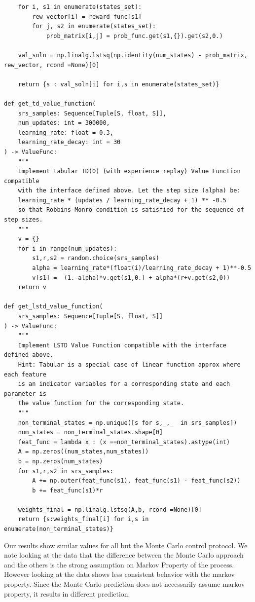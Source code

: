 \documentclass{article}[12pt]
\begin{document}
\begin{lstlisting}
    for i, s1 in enumerate(states_set):
        rew_vector[i] = reward_func[s1]
        for j, s2 in enumerate(states_set):
            prob_matrix[i,j] = prob_func.get(s1,{}).get(s2,0.)

    val_soln = np.linalg.lstsq(np.identity(num_states) - prob_matrix, rew_vector, rcond =None)[0]

    return {s : val_soln[i] for i,s in enumerate(states_set)}

def get_td_value_function(
    srs_samples: Sequence[Tuple[S, float, S]],
    num_updates: int = 300000,
    learning_rate: float = 0.3,
    learning_rate_decay: int = 30
) -> ValueFunc:
    """
    Implement tabular TD(0) (with experience replay) Value Function compatible
    with the interface defined above. Let the step size (alpha) be:
    learning_rate * (updates / learning_rate_decay + 1) ** -0.5
    so that Robbins-Monro condition is satisfied for the sequence of step sizes.
    """
    v = {}
    for i in range(num_updates):
        s1,r,s2 = random.choice(srs_samples)
        alpha = learning_rate*(float(i)/learning_rate_decay + 1)**-0.5
        v[s1] =  (1.-alpha)*v.get(s1,0.) + alpha*(r+v.get(s2,0))
    return v

def get_lstd_value_function(
    srs_samples: Sequence[Tuple[S, float, S]]
) -> ValueFunc:
    """
    Implement LSTD Value Function compatible with the interface defined above.
    Hint: Tabular is a special case of linear function approx where each feature
    is an indicator variables for a corresponding state and each parameter is
    the value function for the corresponding state.
    """
    non_terminal_states = np.unique([s for s,_,_  in srs_samples])
    num_states = non_terminal_states.shape[0]
    feat_func = lambda x : (x ==non_terminal_states).astype(int)
    A = np.zeros((num_states,num_states))
    b = np.zeros(num_states)
    for s1,r,s2 in srs_samples:
        A += np.outer(feat_func(s1), feat_func(s1) - feat_func(s2))
        b += feat_func(s1)*r

    weights_final = np.linalg.lstsq(A,b, rcond =None)[0]
    return {s:weights_final[i] for i,s in enumerate(non_terminal_states)}
\end{lstlisting}

Our results show similar values for all but the Monte Carlo control protocol. We note looking at the data that the difference between the Monte Carlo approach and the others is the strong assumption on Markov Property of the process. However looking at the data shows less consistent behavior with the markov property. Since the Monte Carlo prediction does not necessarily assume markov property, it results in different prediction.
\end{document}
